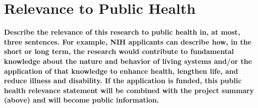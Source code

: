 \documentclass[11pt]{article}
\begin{document}
\section*{Relevance to Public Health}

\textbf{Describe the relevance of this research to public health in, at most, three sentences. For example,
NIH applicants can describe how, in the short or long term, the research would contribute to
fundamental knowledge about the nature and behavior of living systems and/or the application
of that knowledge to enhance health, lengthen life, and reduce illness and disability. If the
application is funded, this public health relevance statement will be combined with the project
summary (above) and will become public information.}

\lipsum[111]
\end{document}
